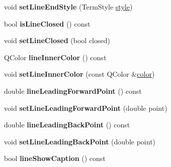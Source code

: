 \begin{DoxyCompactItemize}
void {\bfseries set\+Line\+End\+Style} (Term\+Style \hyperlink{class_poppler_1_1_annotation_a4857ee8533e1430f5776507f465040a8}{style})
\item 
\mbox{\label{class_poppler_1_1_line_annotation_a8846bb30e9a65dfdb7df6f129449e4de}} 
bool {\bfseries is\+Line\+Closed} () const
\item 
\mbox{\label{class_poppler_1_1_line_annotation_af39a0e43800358f15589fa2d735ef695}} 
void {\bfseries set\+Line\+Closed} (bool closed)
\item 
\mbox{\label{class_poppler_1_1_line_annotation_ad67edf81b52426a2efa2977b16c1ef82}} 
Q\+Color {\bfseries line\+Inner\+Color} () const
\item 
\mbox{\label{class_poppler_1_1_line_annotation_adfbe428057251d29bc8090b4f0ffbedf}} 
void {\bfseries set\+Line\+Inner\+Color} (const Q\+Color \&\hyperlink{structcolor}{color})
\item 
\mbox{\label{class_poppler_1_1_line_annotation_a54f1dcd7f0fd9d834fd406b3855005b5}} 
double {\bfseries line\+Leading\+Forward\+Point} () const
\item 
\mbox{\label{class_poppler_1_1_line_annotation_aa03c14f339bf86226d147da314c4f06c}} 
void {\bfseries set\+Line\+Leading\+Forward\+Point} (double point)
\item 
\mbox{\label{class_poppler_1_1_line_annotation_a36f08119e1191e620523b79e14d745ce}} 
double {\bfseries line\+Leading\+Back\+Point} () const
\item 
\mbox{\label{class_poppler_1_1_line_annotation_ad2e4aa5fb3311417936e6e5004a01c69}} 
void {\bfseries set\+Line\+Leading\+Back\+Point} (double point)
\item 
\mbox{\label{class_poppler_1_1_line_annotation_a600e4affdbf410a45e1666a34aa3d50e}} 
bool {\bfseries line\+Show\+Caption} () const
\item 

\end{DoxyCompactItemize}
